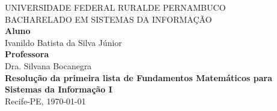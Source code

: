 \documentclass[12pt]{article}
\begin{document}
\begin{titlepage}
\centering
 \vfill
  \begin{center}


   {\large {UNIVERSIDADE FEDERAL RURALDE PERNAMBUCO \\
BACHARELADO EM SISTEMAS DA INFORMAÇÃO
}}\\[4cm]

   {\large {\textbf{Aluno} \\
   Ivanildo Batista da Silva Júnior
   }}\\[.5cm]
   
   {\large {\textbf{Professora}\\ Dra. Silvana Bocanegra}}\\[3cm]
   {\large \textbf{Resolução da primeira lista de Fundamentos Matemáticos para Sistemas da Informação I}}\\[10.5cm] 
   
\normalsize {Recife-PE, \today}
\newpage

  \vfill
\end{center}
\end{titlepage}


\newpage

\tableofcontents
\thispagestyle{empty}
\newpage

\newpage
\setcounter{page}{1}
\end{document}
